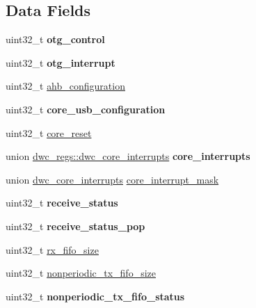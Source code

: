 \subsection*{Data Fields}
\begin{DoxyCompactItemize}
\item 
\hypertarget{structdwc__regs_ab563117ae9b41f0f54987eb5f0c3b5f8}{uint32\-\_\-t {\bfseries otg\-\_\-control}}\label{structdwc__regs_ab563117ae9b41f0f54987eb5f0c3b5f8}

\item 
\hypertarget{structdwc__regs_a0dc3c29e7ac2d4115c59464e6ee2e4a7}{uint32\-\_\-t {\bfseries otg\-\_\-interrupt}}\label{structdwc__regs_a0dc3c29e7ac2d4115c59464e6ee2e4a7}

\item 
uint32\-\_\-t \hyperlink{structdwc__regs_ad74731204d34ff5599e0f29b9e93722b}{ahb\-\_\-configuration}
\item 
\hypertarget{structdwc__regs_ac7a1aca3006f597d58e744ed1b3ff4f0}{uint32\-\_\-t {\bfseries core\-\_\-usb\-\_\-configuration}}\label{structdwc__regs_ac7a1aca3006f597d58e744ed1b3ff4f0}

\item 
uint32\-\_\-t \hyperlink{structdwc__regs_abe0dd3634e82145f915c93f43e4e1c5a}{core\-\_\-reset}
\item 
\hypertarget{structdwc__regs_a259ee390045d150ed1ae8ea5dda8d6eb}{union \hyperlink{uniondwc__regs_1_1dwc__core__interrupts}{dwc\-\_\-regs\-::dwc\-\_\-core\-\_\-interrupts} {\bfseries core\-\_\-interrupts}}\label{structdwc__regs_a259ee390045d150ed1ae8ea5dda8d6eb}

\item 
union \hyperlink{uniondwc__regs_1_1dwc__core__interrupts}{dwc\-\_\-core\-\_\-interrupts} \hyperlink{structdwc__regs_a780c81354a4696a5676f906de7490163}{core\-\_\-interrupt\-\_\-mask}
\item 
\hypertarget{structdwc__regs_a9d9f091851c612c8758057f4f659da74}{uint32\-\_\-t {\bfseries receive\-\_\-status}}\label{structdwc__regs_a9d9f091851c612c8758057f4f659da74}

\item 
\hypertarget{structdwc__regs_a1de4226e21d66b331bd707b88736396c}{uint32\-\_\-t {\bfseries receive\-\_\-status\-\_\-pop}}\label{structdwc__regs_a1de4226e21d66b331bd707b88736396c}

\item 
uint32\-\_\-t \hyperlink{structdwc__regs_a59bf777de1765b60e3d6a4b68b1cf1f4}{rx\-\_\-fifo\-\_\-size}
\item 
uint32\-\_\-t \hyperlink{structdwc__regs_a20bfce298b07fa70a9b94c8293f09a66}{nonperiodic\-\_\-tx\-\_\-fifo\-\_\-size}
\item 
\hypertarget{structdwc__regs_a262354bf2ce141acd072a8908d0adcab}{uint32\-\_\-t {\bfseries nonperiodic\-\_\-tx\-\_\-fifo\-\_\-status}}\label{structdwc__regs_a262354bf2ce141acd072a8908d0adcab}


\end{DoxyCompactItemize}
